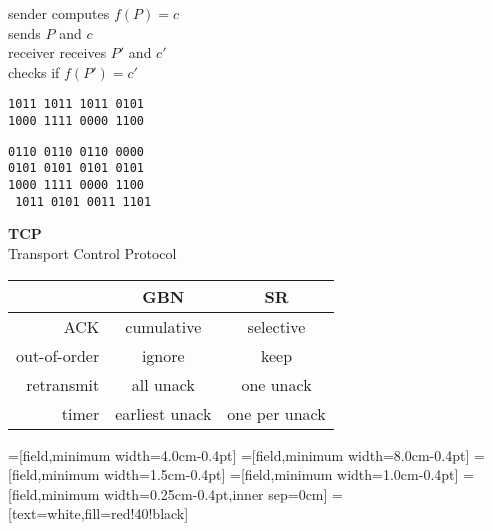 \begin{cf}
	sender computes $f(P) = c$\\
	sends $P$ and $c$\\[6pt]
	receiver receives $P'$ and $c'$\\
	checks if $f(P') = c'$
\end{cf}

\begin{cf}[t]{ 
	\texttt{1011 1011 1011 0101}\\
	\texttt{1000 1111 0000 1100}\\
}
\end{cf}

\begin{cf}[t]{ 
	\texttt{0110 0110 0110 0000}\\
	\texttt{0101 0101 0101 0101}\\
	\texttt{1000 1111 0000 1100}\\
	\texttt{\color{blue} 1011 0101 0011 1101}\\
}
\end{cf}

\begin{cf}{
	\textbf{TCP}\\
	Transport Control Protocol
	}
\end{cf}

\begin{cf}{\small
	\begin{tabular}{|r|c|c|}
	\hline
	        & GBN & SR \\
	\hline
	ACK	& cumulative & selective \\
	out-of-order & ignore & keep \\
	retransmit	& all unack & one unack \\
	timer &	earliest unack & one per unack \\
	\hline
	\end{tabular}
}
\end{cf}

=[field,minimum width=4.0cm-0.4pt]
=[field,minimum width=8.0cm-0.4pt]
=[field,minimum width=1.5cm-0.4pt]
=[field,minimum width=1.0cm-0.4pt]
=[field,minimum width=0.25cm-0.4pt,inner sep=0cm]
=[text=white,fill=red!40!black]

